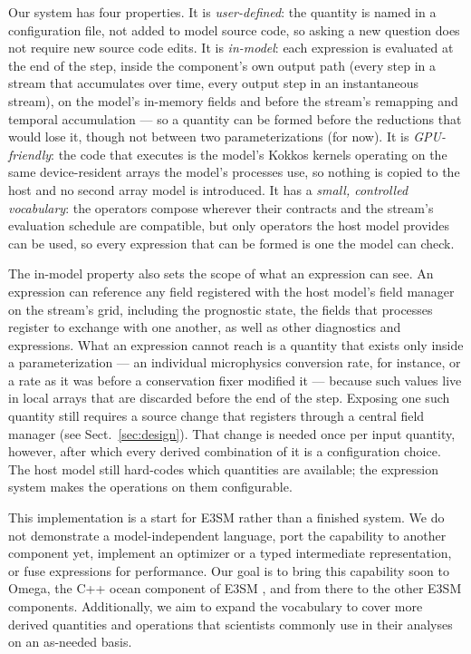 \documentclass[gmd, manuscript]{copernicus}
\begin{document}
Our system has four properties. It is \emph{user-defined}: the quantity is named in a configuration file, not added to model source code, so asking a new question does not require new source code edits. It is \emph{in-model}: each expression is evaluated at the end of the step, inside the component's own output path (every step in a stream that accumulates over time, every output step in an instantaneous stream), on the model's in-memory fields and before the stream's remapping and temporal accumulation --- so a quantity can be formed before the reductions that would lose it, though not between two parameterizations (for now). It is \emph{GPU-friendly}: the code that executes is the model's Kokkos kernels operating on the same device-resident arrays the model's processes use, so nothing is copied to the host and no second array model is introduced. It has a \emph{small, controlled vocabulary}: the operators compose wherever their contracts and the stream's evaluation schedule are compatible, but only operators the host model provides can be used, so every expression that can be formed is one the model can check.

The in-model property also sets the scope of what an expression can see. An expression can reference any field registered with the host model's field manager on the stream's grid, including the prognostic state, the fields that processes register to exchange with one another, as well as other diagnostics and expressions. What an expression cannot reach is a quantity that exists only inside a parameterization --- an individual microphysics conversion rate, for instance, or a rate as it was before a conservation fixer modified it --- because such values live in local arrays that are discarded before the end of the step. Exposing one such quantity still requires a source change that registers through a central field manager (see Sect.~\ref{sec:design}). That change is needed once per input quantity, however, after which every derived combination of it is a configuration choice. The host model still hard-codes which quantities are available; the expression system makes the operations on them configurable.

This implementation is a start for E3SM rather than a finished system. We do not demonstrate a model-independent language, port the capability to another component yet, implement an optimizer or a typed intermediate representation, or fuse expressions for performance. Our goal is to bring this capability soon to Omega, the C++ ocean component of E3SM \citep{petersen_ocean_2026}, and from there to the other E3SM components. Additionally, we aim to expand the vocabulary to cover more derived quantities and operations that scientists commonly use in their analyses on an as-needed basis.
\end{document}
